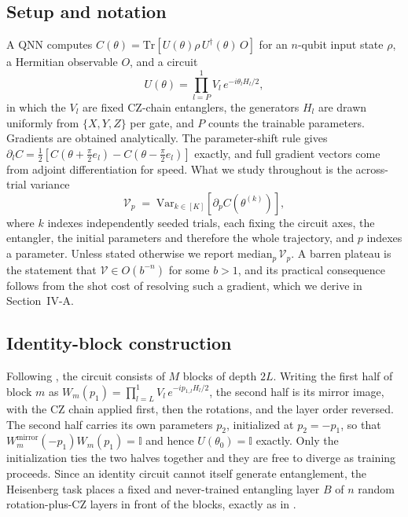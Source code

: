 \documentclass[conference]{IEEEtran}%
\begin{document}
\subsection{Setup and notation}
A QNN computes $C(\theta)=\mathrm{Tr}\!\left[U(\theta)\rho\,U^\dagger(\theta)\,O\right]$ for an $n$-qubit input state $\rho$, a Hermitian observable $O$, and a circuit
\begin{equation}
U(\theta)=\prod_{l=P}^{1} V_l\,e^{-i\theta_l H_l/2},
\label{eq:ansatz}
\end{equation}
in which the $V_l$ are fixed CZ-chain entanglers, the generators $H_l$ are drawn uniformly from $\{X,Y,Z\}$ per gate, and $P$ counts the trainable parameters. Gradients are obtained analytically. The parameter-shift rule \cite{mitarai,schuld} gives $\partial_l C=\tfrac12[C(\theta+\tfrac\pi2 e_l)-C(\theta-\tfrac\pi2 e_l)]$ exactly, and full gradient vectors come from adjoint differentiation for speed. What we study throughout is the across-trial variance
\begin{equation}
\mathcal{V}_p \;=\; \mathrm{Var}_{k\in[K]}\!\left[\partial_p C(\theta^{(k)})\right],
\label{eq:var}
\end{equation}
where $k$ indexes independently seeded trials, each fixing the circuit axes, the entangler, the initial parameters and therefore the whole trajectory, and $p$ indexes a parameter. Unless stated otherwise we report $\mathrm{median}_p\,\mathcal{V}_p$. A barren plateau is the statement that $\mathcal V\in O(b^{-n})$ for some $b>1$, and its practical consequence follows from the shot cost of resolving such a gradient, which we derive in Section~IV-A.

\subsection{Identity-block construction}
Following \cite{grant}, the circuit consists of $M$ blocks of depth $2L$. Writing the first half of block $m$ as $W_m(p_1)=\prod_{l=L}^{1} V_l\, e^{-ip_{1,l}H_l/2}$, the second half is its mirror image, with the CZ chain applied first, then the rotations, and the layer order reversed. The second half carries its own parameters $p_2$, initialized at $p_2=-p_1$, so that $W_m^{\text{mirror}}(-p_1)W_m(p_1)=\mathbb{I}$ and hence $U(\theta_0)=\mathbb{I}$ exactly. Only the initialization ties the two halves together and they are free to diverge as training proceeds. Since an identity circuit cannot itself generate entanglement, the Heisenberg task places a fixed and never-trained entangling layer $B$ of $n$ random rotation-plus-CZ layers in front of the blocks, exactly as in \cite{grant}.
\end{document}
